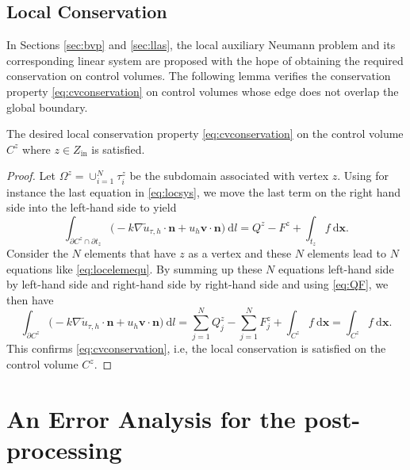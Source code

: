 \documentclass[times]{nlaauth}
\numberwithin{equation}{section}
\begin{document}
\subsection{Local Conservation}
\noindent
In Sections \ref{sec:bvp} and \ref{sec:llas}, the local auxiliary Neumann problem and its corresponding linear system are proposed with the hope of obtaining the required conservation on control volumes. The following lemma verifies the conservation property \eqref{eq:cvconservation} on control volumes whose edge does not overlap the global boundary.

\begin{lem}  \label{lem:localconserv}
The desired local conservation property \eqref{eq:cvconservation} on the control volume $C^z$ where $z\in Z_{\text{in}}$ is satisfied.
\end{lem}

\begin{proof}
Let $\Omega^z = \cup_{i=1}^N \tau_i^z$ be the subdomain associated with vertex $z$. Using for instance the last equation in \eqref{eq:locsys}, we move the last term
on the right hand side into the left-hand side to yield
\begin{equation} \label{eq:locelemequ}
 \int_{ \partial C^z \cap \partial t_z } \big( - k\nabla \widetilde u_{\tau, h} \cdot \boldsymbol{n}  + u_h \boldsymbol{v} \cdot \boldsymbol{n}  \big) \ \text{d} l = Q^z - F^z + \int_{t_z} f \ \text{d} \boldsymbol{x}.
\end{equation}
Consider the $N$ elements that have $z$ as a vertex and these $N$ elements lead to $N$ equations  like \eqref{eq:locelemequ}. By summing up these $N$ equations left-hand side by left-hand side and right-hand side by right-hand side and using \eqref{eq:QF}, we then have
\begin{equation*}
 \int_{ \partial C^z } \big( - k \nabla \widetilde u_{\tau, h} \cdot \boldsymbol{n}  + u_h \boldsymbol{v} \cdot \boldsymbol{n} \big) \ \text{d} l = \sum_{j=1}^N Q^z_j - \sum_{j=1}^N F^z_j + \int_{C^z} f \ \text{d} \boldsymbol{x}  = \int_{C^z} f \ \text{d} \boldsymbol{x}.
\end{equation*}
This confirms \eqref{eq:cvconservation}, i.e, the local conservation is satisfied on the control volume $C^z.$
\end{proof}

\section{An Error Analysis for the post-processing}  \label{sec:ana}
\end{document}
